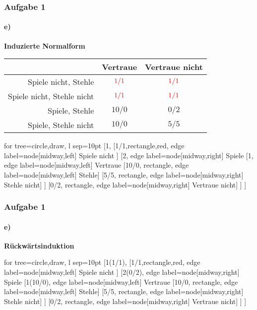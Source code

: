\documentclass{beamer}
\begin{document}
\begin{frame}
	\frametitle{Aufgabe 1}
	\framesubtitle{e)}
	\centering
	\textbf{Induzierte Normalform}\\
	\begin{tabular}{r|c|c|}
		& Vertraue & Vertraue nicht \\
		\hline
		Spiele nicht, Stehle & $\textcolor{red}{1/1}$ & $\textcolor{red}{1/1}$ \\
		Spiele nicht, Stehle nicht & $\textcolor{red}{1/1}$ & $\textcolor{red}{1/1}$ \\
		Spiele, Stehle & $10/0$ & $0/2$ \\
		Spiele, Stehle nicht & $10/0$ & $5/5$ \\
		\hline
	\end{tabular}	
		\begin{forest}
			for tree={circle,draw, l sep=10pt}
			[1, 
			[1/1,rectangle,red, edge label={node[midway,left] {Spiele nicht}} ]
			[2, edge label={node[midway,right] {Spiele}} 
			[1, edge label={node[midway,left] {Vertraue}}
			[10/0, rectangle, edge label={node[midway,left] {Stehle}}]
			[5/5, rectangle, edge label={node[midway,right] {Stehle nicht}}]
			] 
			[0/2, rectangle, edge label={node[midway,right] {Vertraue nicht}}]
			] 
			]
		\end{forest}
\end{frame}

\begin{frame}
	\frametitle{Aufgabe 1}
	\framesubtitle{e)}
	\centering
	\textbf{Rückwärtsinduktion}\\	
	\begin{forest}
		for tree={circle,draw, l sep=10pt}
		[1(1/1), 
		[1/1,rectangle,red, edge label={node[midway,left] {Spiele nicht}} ]
		[2(0/2), edge label={node[midway,right] {Spiele}} 
		[1(10/0), edge label={node[midway,left] {Vertraue}}
		[10/0, rectangle, edge label={node[midway,left] {Stehle}}]
		[5/5, rectangle, edge label={node[midway,right] {Stehle nicht}}]
		] 
		[0/2, rectangle, edge label={node[midway,right] {Vertraue nicht}}]
		] 
		]
	\end{forest}
\end{frame}
\end{document}
